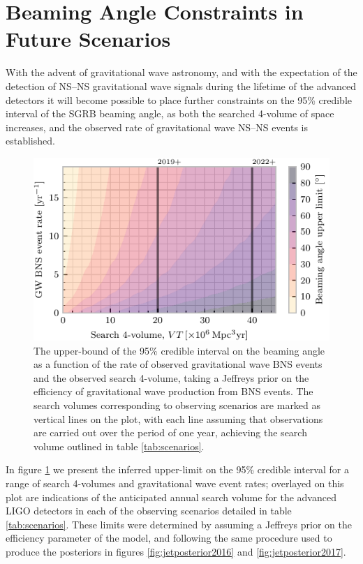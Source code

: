 \documentclass[twocolumn]{aastex61}
\newcommand{\BNS}{\ac{NS}--\ac{NS}\xspace}
\begin{document}
\section{Beaming Angle Constraints in Future Scenarios}
\label{sec:future}
With the advent of gravitational wave astronomy, and with the
expectation of the detection of \BNS gravitational wave signals during
the lifetime of the advanced detectors it will become possible to
place further constraints on the 95\% credible interval of the SGRB
beaming angle, as both the searched 4-volume of space increases, and
the observed rate of gravitational wave \BNS events is established.

\begin{figure}
\centering
\includegraphics[width=\linewidth]{volume_v_nevents.pdf}
\caption{\label{fig:volumevevents} The upper-bound of the 95\%
  credible interval on the beaming angle as a function of the rate of
  observed gravitational wave BNS events and the observed search
  4-volume, taking a Jeffreys prior on the efficiency of gravitational
  wave production from BNS events. The search volumes corresponding to
  observing scenarios are marked as vertical lines on the plot,
  with each line assuming that observations are carried out over the
  period of one year, achieving the search volume outlined in table
  \ref{tab:scenarios}.}
\end{figure}

In figure \ref{fig:volumevevents} we present the inferred upper-limit
on the 95\% credible interval for a range of search 4-volumes and
gravitational wave event rates; overlayed on this plot are indications
of the anticipated annual search volume for the advanced LIGO
detectors in each of the observing scenarios detailed in table
\ref{tab:scenarios}. These limits were determined by assuming a
Jeffreys prior on the efficiency parameter of the model, and following
the same procedure used to produce the posteriors in figures
\ref{fig:jetposterior2016} and \ref{fig:jetposterior2017}.
\end{document}
